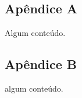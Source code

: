 %
%

\begin{apendicesenv}

\chapter*{Apêndice A}

Algum conteúdo.

\end{apendicesenv}

\begin{apendicesenv}

\chapter*{Apêndice B}

algum conteúdo.

\end{apendicesenv}
